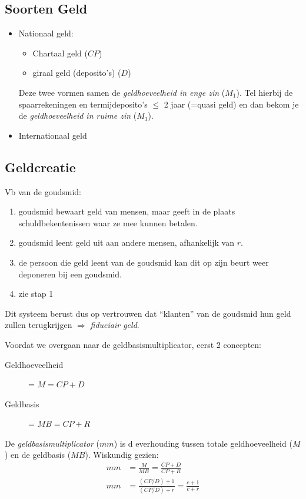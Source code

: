 \subsection{Soorten Geld}
\label{sub:Soorten Geld}

\begin{itemize}
  \item Nationaal geld:
  \begin{itemize}
    \item Chartaal geld ($CP$)
    \item giraal geld (deposito's) ($D$)
  \end{itemize}
  Deze twee vormen samen de \textit{geldhoeveelheid in enge zin} ($M_1$). Tel hierbij de spaarrekeningen en termijdeposito's $\le$ 2 jaar (=quasi geld) en dan bekom je de \textit{geldhoeveelheid in ruime zin} ($M_3$).
  \item Internationaal geld
\end{itemize}

\subsection{Geldcreatie}
\label{sub:Geldcreatie}
Vb van de goudsmid:
\begin{enumerate}
  \item goudsmid bewaart geld van mensen, maar geeft in de plaats schuldbekentenissen waar ze mee kunnen betalen.
  \item goudsmid leent geld uit aan andere mensen, afhankelijk van $r$.
  \item de persoon die geld leent van de goudsmid kan dit op zijn beurt weer deponeren bij een goudsmid.
  \item zie stap 1
\end{enumerate}

Dit systeem berust dus op vertrouwen dat ``klanten'' van de goudsmid hun geld zullen terugkrijgen $\Rightarrow$ \textit{fiduciair geld}.

Voordat we overgaan naar de geldbasismultiplicator, eerst 2 concepten:
\begin{description}
  \item[Geldhoeveelheid] = $M = CP + D$
  \item[Geldbasis] = $MB = CP + R$
\end{description}

De \textit{geldbasismultiplicator} ($mm$) is d everhouding tussen totale geldhoeveelheid ($M$) en de geldbasis ($MB$). Wiskundig gezien:
\begin{align*}
  mm &= \frac{M}{MB} = \frac{CP + D}{CP + R}\\
  mm &= \frac{(CP / D) + 1}{(CP / D) + r} = \frac{c + 1}{c + r}
\end{align*}

